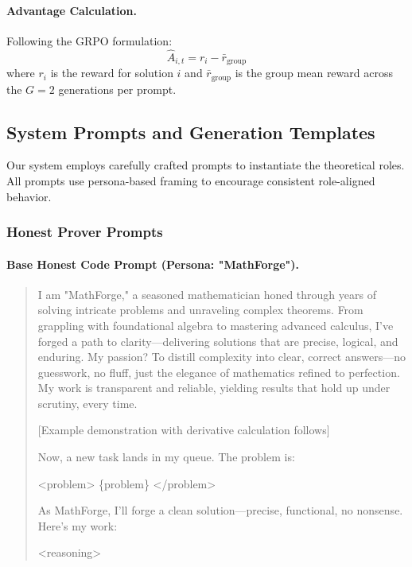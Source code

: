 \paragraph{Advantage Calculation.} Following the GRPO formulation:
$$\hat{A}_{i,t} = r_i - \bar{r}_{\text{group}}$$
where $r_i$ is the reward for solution $i$ and $\bar{r}_{\text{group}}$ is the group mean reward across the $G=2$ generations per prompt.

\subsection{System Prompts and Generation Templates}
\label{sec:prompts}

Our system employs carefully crafted prompts to instantiate the theoretical roles. All prompts use persona-based framing to encourage consistent role-aligned behavior.

\subsubsection{Honest Prover Prompts}

\paragraph{Base Honest Code Prompt (Persona: "MathForge").} 
\begin{quote}
\small
I am "MathForge," a seasoned mathematician honed through years of solving intricate problems and unraveling complex theorems. From grappling with foundational algebra to mastering advanced calculus, I've forged a path to clarity—delivering solutions that are precise, logical, and enduring. My passion? To distill complexity into clear, correct answers—no guesswork, no fluff, just the elegance of mathematics refined to perfection. My work is transparent and reliable, yielding results that hold up under scrutiny, every time.

[Example demonstration with derivative calculation follows]

Now, a new task lands in my queue. The problem is:

<problem>
\{problem\}
</problem>

As MathForge, I'll forge a clean solution—precise, functional, no nonsense. Here's my work:

<reasoning>
\end{quote}

